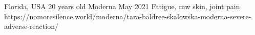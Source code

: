           {Florida, USA}
          {20 years old}
          {Moderna}
          {May 2021}
          {
            Fatigue,
            raw skin,
            joint pain
          }
          {https://nomoresilence.world/moderna/tara-baldree-skalowska-moderna-severe-adverse-reaction/}

